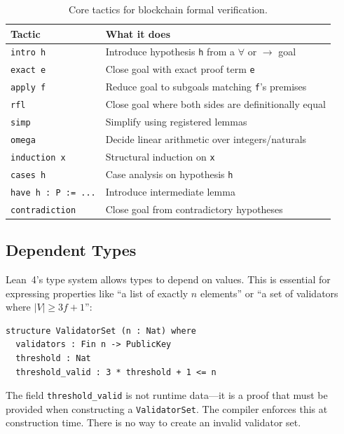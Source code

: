 \begin{table}[H]
\centering
\small
\begin{tabular}{@{}ll@{}}
\toprule
\textbf{Tactic} & \textbf{What it does} \\
\midrule
\texttt{intro h} & Introduce hypothesis \texttt{h} from a $\forall$ or $\to$ goal \\
\texttt{exact e} & Close goal with exact proof term \texttt{e} \\
\texttt{apply f} & Reduce goal to subgoals matching \texttt{f}'s premises \\
\texttt{rfl} & Close goal where both sides are definitionally equal \\
\texttt{simp} & Simplify using registered lemmas \\
\texttt{omega} & Decide linear arithmetic over integers/naturals \\
\texttt{induction x} & Structural induction on \texttt{x} \\
\texttt{cases h} & Case analysis on hypothesis \texttt{h} \\
\texttt{have h : P := ...} & Introduce intermediate lemma \\
\texttt{contradiction} & Close goal from contradictory hypotheses \\
\bottomrule
\end{tabular}
\caption{Core tactics for blockchain formal verification.}
\end{table}

\subsection{Dependent Types}

Lean~4's type system allows types to depend on values. This is essential for expressing
properties like ``a list of exactly $n$ elements'' or ``a set of validators where
$|V| \geq 3f + 1$'':

\begin{lstlisting}[language=Lean,caption={Dependent types for validator sets}]
structure ValidatorSet (n : Nat) where
  validators : Fin n -> PublicKey
  threshold : Nat
  threshold_valid : 3 * threshold + 1 <= n
\end{lstlisting}

The field \texttt{threshold\_valid} is not runtime data---it is a proof that must be
provided when constructing a \texttt{ValidatorSet}. The compiler enforces this at
construction time. There is no way to create an invalid validator set.


